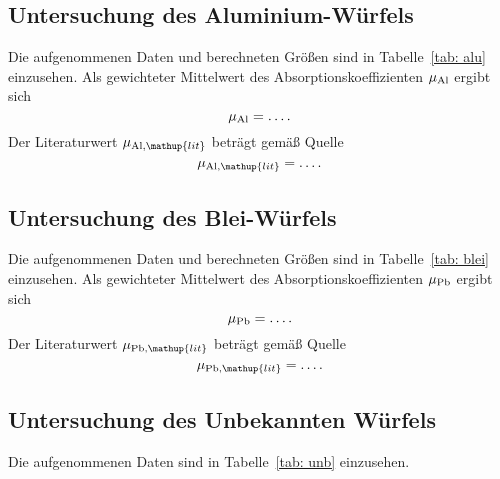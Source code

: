 \subsection{Untersuchung des Aluminium-Würfels}
Die aufgenommenen Daten und berechneten Größen sind in Tabelle~\ref{tab: alu} einzusehen.
Als gewichteter Mittelwert des Absorptionskoeffizienten $\mu_{\ce{Al}}$ ergibt sich
\begin{equation}
  \mu_{\ce{Al}} = \dots .
\end{equation}
Der Literaturwert $\mu_{\ce{Al}, \mathup{lit}}$ beträgt gemäß Quelle \cite{}
\begin{equation}
  \mu_{\ce{Al}, \mathup{lit}} = \dots .
\end{equation}

\subsection{Untersuchung des Blei-Würfels}
Die aufgenommenen Daten und berechneten Größen sind in Tabelle~\ref{tab: blei} einzusehen.
%
Als gewichteter Mittelwert des Absorptionskoeffizienten $\mu_{\ce{Pb}}$ ergibt sich
\begin{equation}
  \mu_{\ce{Pb}} = \dots .
\end{equation}
Der Literaturwert $\mu_{\ce{Pb}, \mathup{lit}}$ beträgt gemäß Quelle \cite{}
\begin{equation}
  \mu_{\ce{Pb}, \mathup{lit}} = \dots .
\end{equation}


\subsection{Untersuchung des Unbekannten Würfels}
Die aufgenommenen Daten sind in Tabelle~\ref{tab: unb} einzusehen.
